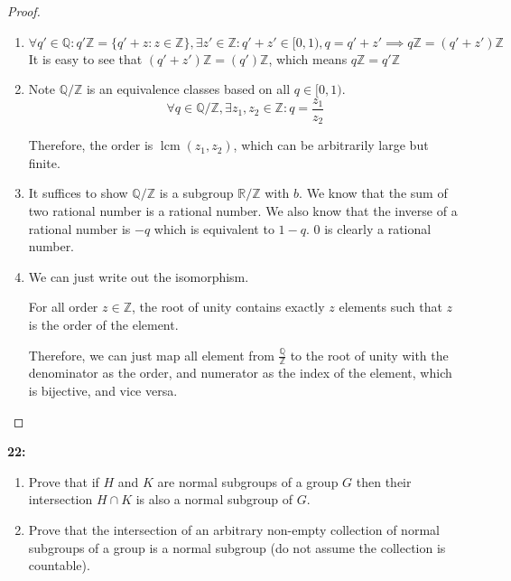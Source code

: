 \documentclass[11pt]{article}
\newcommand{\Q}{\mathbb{Q}}
\newcommand{\R}{\mathbb{R}}
\newcommand{\Z}{\mathbb{Z}}
\newenvironment{exercise}[1]
	{\noindent \textbf{#1:}}
	{\par \vspace{0.5\baselineskip}}
\begin{document}
\begin{proof}
	\begin{enumerate}[label=\emph{\alph*}]
		\item \[
			      \forall q' \in \Q: q'\Z = \{q'+z : z \in \Z\}, \exists z' \in \Z: q'+z' \in [0,1), q = q'+z' \implies q\Z = (q'+z')\Z
		      \]
		      It is easy to see that $(q'+z')\Z = (q')\Z$, which means $q\Z=q'\Z$
		\item Note $\Q/\Z$ is an equivalence classes based on all $q \in [0,1)$.
		      \[
			      \forall q \in \Q/\Z, \exists z_1,z_2 \in \Z: q = \frac{z_1}{z_2}
		      \]

		      Therefore, the order is $\operatorname{lcm} (z_1,z_2)$, which can be arbitrarily large but finite.

		\item It suffices to show $\Q/\Z$ is a subgroup $\R/\Z$ with $b$.
		      We know that the sum of two rational number is a rational number.
		      We also know that the inverse of a rational number is $-q$ which is equivalent to $1-q$.
		      $0$ is clearly a rational number.
		\item We can just write out the isomorphism.

		      For all order $z \in \Z$, the root of unity contains exactly $z$ elements such that $z$ is the order of the element.

		      Therefore, we can just map all element from $\frac{\Q}{\Z}$ to the root of unity with the denominator as the order,
		      and numerator as the index of the element, which is bijective, and vice versa.

	\end{enumerate}
\end{proof}

\begin{exercise}{22}
	\begin{enumerate}[label=\emph{\alph*}]
		\item \textsf{Prove that if \(H\) and \(K\) are normal subgroups of a group \(G\) then their intersection \(H \cap K\) is also a normal subgroup of \(G\).}
		\item \textsf{Prove that the intersection of an arbitrary non-empty collection of normal subgroups of a group is a normal subgroup (do not assume the collection is countable).}
	\end{enumerate}
\end{exercise}{}
\end{document}
